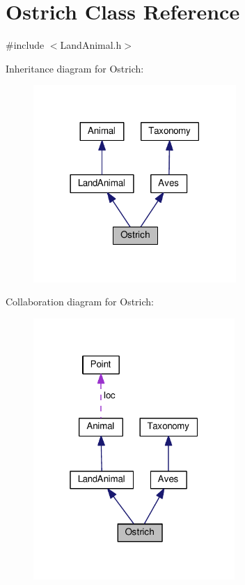\hypertarget{classOstrich}{}\section{Ostrich Class Reference}
\label{classOstrich}


{\ttfamily \#include $<$Land\+Animal.\+h$>$}



Inheritance diagram for Ostrich\+:
\nopagebreak
\begin{figure}[H]
\begin{center}
\leavevmode
\includegraphics[width=218pt]{classOstrich__inherit__graph}
\end{center}
\end{figure}


Collaboration diagram for Ostrich\+:
\nopagebreak
\begin{figure}[H]
\begin{center}
\leavevmode
\includegraphics[width=217pt]{classOstrich__coll__graph}
\end{center}
\end{figure}

